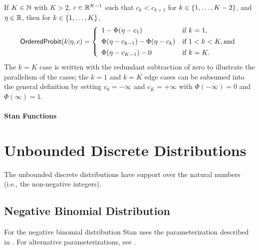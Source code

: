 If $K \in \mathbb{N}$ with $K > 2$, $c \in \mathbb{R}^{K-1}$ such that $c_k <
c_{k+1}$ for $k \in \{ 1,\ldots,K-2 \}$, and $\eta \in \mathbb{R}$, then for $k \in
\{ 1,\ldots,K \}$,
\[
\mbox{\sf OrderedProbit}(k|\eta,c)
=
\left\{
\begin{array}{ll}
1 - \Phi(\eta - c_1) & \mbox{if } k = 1,
\\[4pt]
\Phi(\eta - c_{k-1}) - \Phi(\eta -
c_{k})

& \mbox{if } 1 < k < K, \mbox{and}
\\[4pt]
\Phi(\eta - c_{K-1}) - 0
& \mbox{if } k = K.
\end{array}
\right.
\]
%
The $k=K$ case is written with the redundant subtraction of zero to
illustrate the parallelism of the cases; the $k=1$ and $k=K$ edge
cases can be subsumed into the general definition by setting $c_0 =
-\infty$ and $c_K = +\infty$ with $\Phi(-\infty) = 0$ and
$\Phi(\infty) = 1$.



\subsubsection{Stan Functions}

\begin{description}
%
\end{description}



\chapter{Unbounded Discrete Distributions}

\noindent
The unbounded discrete distributions have support over the natural
numbers (i.e., the non-negative integers).


\section{Negative Binomial Distribution}

For the negative binomial distribution Stan uses the parameterization
described in \citet{GelmanEtAl:2013}.  For alternative parameterizations, see .

